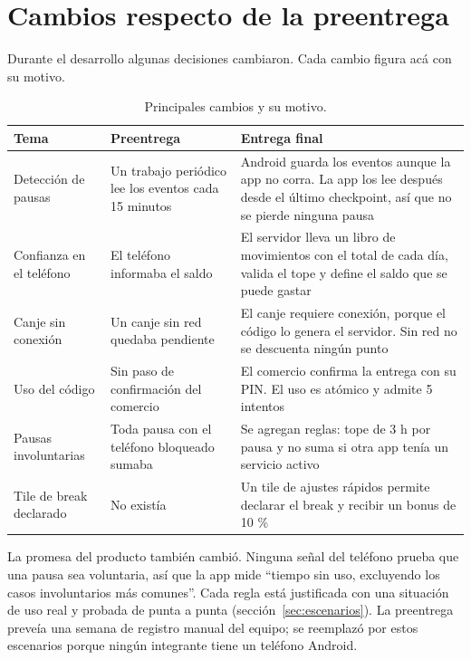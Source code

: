 \section{Cambios respecto de la preentrega}

Durante el desarrollo algunas decisiones cambiaron. Cada cambio figura acá con su motivo.

\begin{table}[H]
\centering
\begin{tabularx}{\linewidth}{@{}L L L@{}}
\toprule
Tema & Preentrega & Entrega final \\
\midrule
Detección de pausas & Un trabajo periódico lee los eventos cada 15 minutos & Android guarda los eventos aunque la app no corra. La app los lee después desde el último checkpoint, así que no se pierde ninguna pausa \\
Confianza en el teléfono & El teléfono informaba el saldo & El servidor lleva un libro de movimientos con el total de cada día, valida el tope y define el saldo que se puede gastar \\
Canje sin conexión & Un canje sin red quedaba pendiente & El canje requiere conexión, porque el código lo genera el servidor. Sin red no se descuenta ningún punto \\
Uso del código & Sin paso de confirmación del comercio & El comercio confirma la entrega con su PIN. El uso es atómico y admite 5 intentos \\
Pausas involuntarias & Toda pausa con el teléfono bloqueado sumaba & Se agregan reglas: tope de 3 h por pausa y no suma si otra app tenía un servicio activo \\
Tile de break declarado & No existía & Un tile de ajustes rápidos permite declarar el break y recibir un bonus de 10 \% \\
\bottomrule
\end{tabularx}
\caption{Principales cambios y su motivo.}
\end{table}

La promesa del producto también cambió. Ninguna señal del teléfono prueba que una pausa sea voluntaria,
así que la app mide ``tiempo sin uso, excluyendo los casos involuntarios más comunes''. Cada regla está
justificada con una situación de uso real y probada de punta a punta (sección~\ref{sec:escenarios}).
La preentrega preveía una semana de registro manual del equipo; se reemplazó por estos escenarios
porque ningún integrante tiene un teléfono Android.

